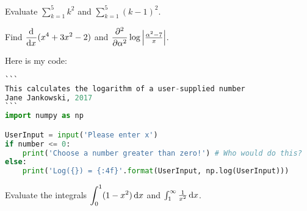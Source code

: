 \documentclass{article}
\begin{document}
\begin{homeworkProblem}[18]
    Evaluate $\displaystyle\sum_{k=1}^{5} k^2$ and $\sum_{k=1}^{5} (k - 1)^2$.

    Find $\displaystyle\deriv{}{x} (x^4 + 3x^2 - 2)$ and $\dpderiv[2]{}{\alpha} \log\left|\frac{\alpha^2-7}{x}\right|$. 
\end{homeworkProblem}

\begin{homeworkProblem}
Here is my code: 
\begin{lstlisting}[language=Python]
```
This calculates the logarithm of a user-supplied number
Jane Jankowski, 2017
```
import numpy as np

UserInput = input('Please enter x')
if number <= 0:
	print('Choose a number greater than zero!') # Who would do this?
else:
	print('Log({}) = {:4f}'.format(UserInput, np.log(UserInput)))	
\end{lstlisting}
\end{homeworkProblem}

\begin{homeworkProblem}[3]
    Evaluate the integrals
    $\displaystyle\int_0^1 (1 - x^2) \dx$
    and
    $\int_1^{\infty} \frac{1}{x^2} \dx$.
\end{homeworkProblem}
\end{document}
